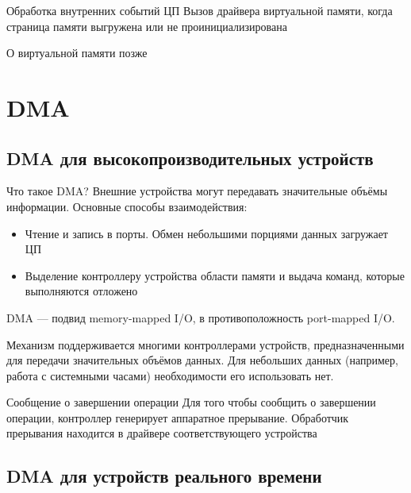 \documentclass[xetex,aspectratio=43]{beamer}
\begin{document}
\begin{frame}{Обработка внутренних событий ЦП}
	Вызов драйвера виртуальной памяти, когда страница памяти выгружена или
	не проинициализирована

	\pause

	О виртуальной памяти позже
\end{frame}

\section{DMA}

\subsection{DMA для высокопроизводительных устройств}

\begin{frame}{Что такое DMA?}
	Внешние устройства могут передавать значительные объёмы информации.
	Основные способы взаимодействия:

	\begin{itemize}
		\tightlist
		\item
		Чтение и запись в порты. Обмен небольшими порциями данных загружает ЦП
		\item
		Выделение контроллеру устройства области памяти и выдача команд,
		которые выполняются отложено
	\end{itemize}

	\pause


    DMA --- подвид memory-mapped I/O, в противоположность port-mapped I/O.

	Механизм поддерживается многими контроллерами устройств,
	предназначенными для передачи значительных объёмов данных. Для небольших данных (например, работа с системными часами) необходимости его использовать нет.
\end{frame}

\begin{frame}{Сообщение о завершении операции}
	Для того чтобы сообщить о завершении операции, контроллер генерирует
	аппаратное прерывание. Обработчик прерывания находится в драйвере
	соответствующего устройства
\end{frame}

\subsection{DMA для устройств реального времени}
\end{document}
